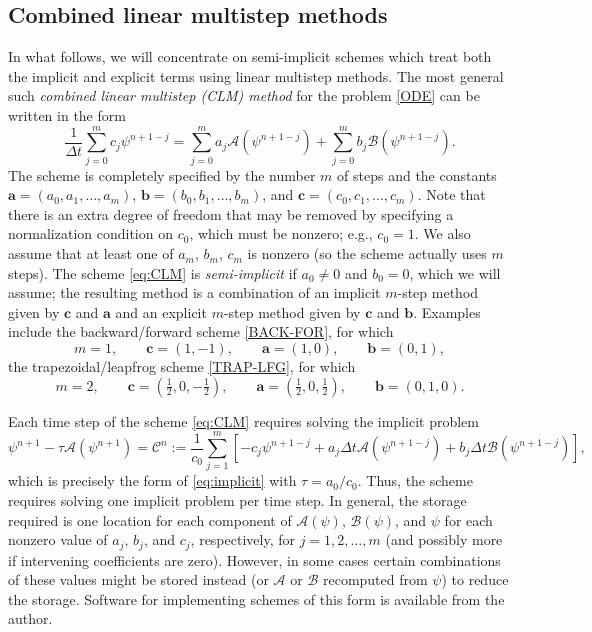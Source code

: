 \documentclass[12pt]{article}
\newcommand{\dt}{\Delta t}
\renewcommand{\a}{\mathbf{a}}
\newcommand{\opA}{\mathcal{A}}
\newcommand{\opB}{\mathcal{B}}
\newcommand{\opC}{\mathcal{C}}
\renewcommand{\b}{\mathbf{b}}
\renewcommand{\c}{\mathbf{c}}
\begin{document}
\pagebreak[3]
\subsection{Combined linear multistep methods\label{sec:CLM}}

In what follows, we will concentrate on semi-implicit schemes which treat both
the implicit and explicit terms using linear multistep methods.  The most
general such \emph{combined linear multistep (CLM) method} for the problem
\eqref{ODE} can be written in the form
\begin{equation}
  \frac{1}{\dt} \sum_{j=0}^{m} c_j \psi^{n+1-j}
  = \sum_{j=0}^{m} a_j \opA\left(\psi^{n+1-j}\right)
  + \sum_{j=0}^{m} b_j \opB\left(\psi^{n+1-j}\right) .
\label{eq:CLM}
\end{equation}
The scheme is completely specified by the number $m$ of steps and the
constants $\a=(a_{0},a_{1},\dots,a_{m})$, $\b=(b_{0},b_{1},\dots,b_{m})$,
and $\c=(c_{0},c_{1},\dots,c_{m})$.  Note that there is an extra degree of
freedom that may be removed by specifying a normalization condition on
$c_{0}$, which must be nonzero; e.g., $c_{0}=1$.  We also assume that at least
one of $a_{m}$, $b_{m}$, $c_{m}$ is nonzero (so the scheme actually uses $m$
steps).  The scheme \eqref{eq:CLM} is \emph{semi-implicit} if $a_{0}\ne0$ and
$b_{0}=0$, which we will assume; the resulting method is a combination of an
implicit $m$-step method given by $\c$ and $\a$ and an explicit $m$-step
method given by $\c$ and $\b$.  Examples include the backward/forward scheme
\eqref{BACK-FOR}, for which
\begin{equation}
m=1,\qquad
\c=\left(1,-1\right), \qquad
\a=\left(1,0\right), \qquad
\b=\left(0,1\right),
\end{equation}
the trapezoidal/leapfrog scheme \eqref{TRAP-LFG}, for which
\begin{equation}
m=2,\qquad
\c=\left(\tfrac12,0,-\tfrac12\right), \qquad
\a=\left(\tfrac12,0,\tfrac12\right), \qquad
\b=\left(0,1,0\right).
\end{equation}

Each time step of the scheme \eqref{eq:CLM} requires solving the implicit 
problem
\begin{equation}
  \psi^{n+1} - \tau \opA\left(\psi^{n+1}\right) = \opC^n
  := \frac{1}{c_{0}}\sum_{j=1}^{m} \left[-c_j \psi^{n+1-j}
  + a_j\dt \opA\left(\psi^{n+1-j}\right) 
  + b_j\dt \opB\left(\psi^{n+1-j}\right)\right] ,
\label{eq:CLM-implicit}
\end{equation}
which is precisely the form of \eqref{eq:implicit} with $\tau=a_{0}/c_{0}$.
Thus, the scheme requires solving one implicit problem per time step.  In
general, the storage required is one location for each component of
$\opA(\psi)$, $\opB(\psi)$, and $\psi$ for each nonzero value of $a_j$, $b_j$,
and $c_j$, respectively, for $j=1,2,\dots,m$ (and possibly more if intervening
coefficients are zero).  However, in some cases certain combinations of these
values might be stored instead (or $\opA$ or $\opB$ recomputed from $\psi$) to
reduce the storage.  Software for implementing schemes of this form is
available from the author.
\end{document}

